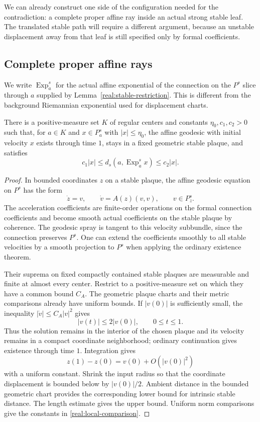 We can already construct one side of the configuration needed for the
contradiction: a complete proper affine ray inside an actual strong
stable leaf. The translated stable path will require a different
argument, because an unstable displacement away from that leaf is still
specified only by formal coefficients.

\subsection{Complete proper affine rays}

We write $\operatorname{Exp}^s_a$ for the actual affine exponential
of the connection on the $P^s$ slice through $a$ supplied by
Lemma~\ref{real:stable-restriction}. This is different from the
background Riemannian exponential used for displacement charts.

\begin{lemma}\label{real:local-stable-exponential}
There is a positive-measure set $K$ of regular centers and constants
$\eta_0,c_1,c_2>0$ such that, for $a\in K$ and
$x\in P^s_a$ with $|x|\le\eta_0$, the affine geodesic with initial
velocity $x$ exists through time $1$, stays in a fixed geometric
stable plaque, and satisfies
\begin{equation}\label{real:local-comparison}
 c_1|x|\le d_s(a,\operatorname{Exp}^s_a x)\le c_2|x|.
\end{equation}
\end{lemma}

\begin{proof}
In bounded coordinates $z$ on a stable plaque, the affine geodesic
equation on $P^s$ has the form
\[
 \dot z=v,\qquad \dot v=A(z)(v,v),\qquad v\in P^s_z.
\]
The acceleration coefficients are finite-order operations on the
formal connection coefficients and become smooth actual
coefficients on the stable plaque by coherence. The geodesic spray
is tangent to this velocity subbundle, since the connection
preserves $P^s$. One can extend the coefficients smoothly to all
stable velocities by a smooth projection to $P^s$ when applying
the ordinary existence theorem.

Their suprema on fixed compactly contained stable plaques are
measurable and finite at almost every center. Restrict to a
positive-measure set on which they have a common bound $C_A$.
The geometric plaque charts and their metric comparisons already
have uniform bounds. If $|v(0)|$ is sufficiently small, the
inequality $|\dot v|\le C_A|v|^2$ gives
\[
 |v(t)|\le 2|v(0)|,\qquad 0\le t\le1.
\]
Thus the solution remains in the interior of the chosen plaque
and its velocity remains in a compact coordinate neighborhood;
ordinary continuation gives existence through time $1$.
Integration gives
\[
 z(1)-z(0)=v(0)+O(|v(0)|^2)
\]
with a uniform constant. Shrink the input radius so that the
coordinate displacement is bounded below by $|v(0)|/2$.
Ambient distance in the bounded geometric chart provides the
corresponding lower bound for intrinsic stable distance. The
length estimate gives the upper bound. Uniform norm comparisons
give the constants in \eqref{real:local-comparison}.
\end{proof}

